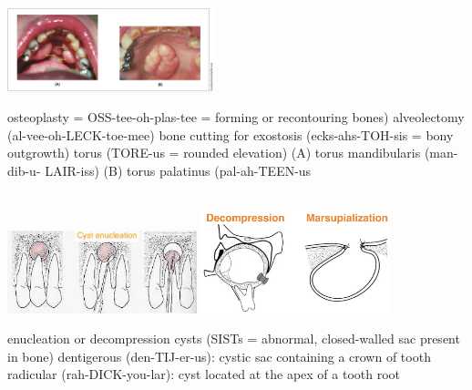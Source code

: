 \documentclass[
paper=landscape,
paper=160mm:90mm, %
fontsize=11pt, %
pagesize, %
parskip=half-, %
]{scrartcl} %
\newenvironment{WrapText1}[3][r]
{\wrapfigure[#2]{#1}{#3}}
{\endwrapfigure}
\newcommand{\wrapr}[6]{
\begin{minipage}{\linewidth}\mbox{}\\
\vspace{#1}
\begin{WrapText1}{#2}{#3}
\vspace{#4}#5\end{WrapText1}#6
\end{minipage}}
\theoremstyle{mythmstyle} %
\newcommand{\comm}[1]{} %
\begin{document}
{%


\wrapr{-10mm}{7}{6cm}{+16mm}
{\includegraphics[width=6cm]{torus.png}}
{%
\begin{outline}
\1 osteoplasty = OSS-tee-oh-plas-tee = forming or recontouring bones)
\1 alveolectomy (al-vee-oh-LECK-toe-mee)
\1 bone cutting for
    \2 exostosis (ecks-ahs-TOH-sis = bony outgrowth)
    \2 torus (TORE-us = rounded elevation)
        \3 (A) torus mandibularis (man-dib-u- LAIR-iss)
        \3 (B) torus palatinus (pal-ah-TEEN-us
        
\end{outline}
} %


\clearpage

\wrapr{-8mm}{7}{6cm}{+8mm}
{%
\includegraphics[width=5.5cm]{enucleation.jpeg}
\includegraphics[width=5.5cm]{decompression.jpeg}
} %
{%
\begin{outline}
\1 enucleation or decompression
    \2 cysts (SISTs = abnormal, closed-walled sac present in bone)
    \3 dentigerous (den-TIJ-er-us): cystic sac containing a crown of tooth
    \3 radicular (rah-DICK-you-lar): cyst located at the apex of a tooth root
\end{outline}
} %

} %
\end{document}
